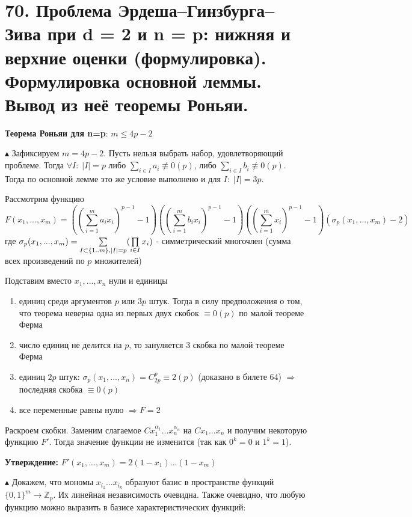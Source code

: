 \section*{70. Проблема Эрдеша–Гинзбурга–Зива при d = 2 и n = p: нижняя и верхние оценки (формулировка). Формулировка основной леммы. Вывод из неё теоремы Роньяи.}
\par \textbf{Теорема Роньяи для n=p}: $m \leq 4p-2$
\par $\blacktriangle$ Зафиксируем $m=4p-2$. Пусть нельзя выбрать набор, удовлетворяющий проблеме. Тогда $\forall I: \; |I|=p$ либо $\sum\limits_{i \in I}a_i \not\equiv 0(p)$, либо $\sum\limits_{i \in I}b_i \not\equiv 0(p)$. Тогда по основной лемме это же условие выполнено и для $I: \; |I|=3p$.
\par Рассмотрим функцию
$$F(x_1, ..., x_m)=\left(\left(\sum_{i = 1}^m a_i x_i\right)^{p-1}-1\right)\left(\left(\sum_{i = 1}^m b_i x_i\right)^{p-1}-1\right)\left(\left(\sum_{i = 1}^m  x_i\right)^{p-1}-1\right)\left(\sigma_p(x_1, ..., x_m)-2\right)$$
где $\sigma_p(x_1, ..., x_m) = \sum\limits_{I \subset \{1..m\},\\ |I|=p}(\prod\limits_{i \in I} x_i)$ - симметрический многочлен (сумма всех произведений по $p$ множителей)
\par Подставим вместо $x_1, ..., x_n$ нули и единицы
\begin{enumerate}
    \item единиц среди аргументов $p$ или $3p$ штук. Тогда в силу предположения о том, что теорема неверна одна из первых двух скобок $\equiv 0(p)$ по малой теореме Ферма
    \item число единиц не делится на $p$, то зануляется 3 скобка по малой теореме Ферма
    \item единиц $2p$ штук: $\sigma_p(x_1, ..., x_n) = C_{2p}^p \equiv 2 (p)$ (доказано в билете 64) $\Rightarrow$ последняя скобка $\equiv 0(p)$
    \item все переменные равны нулю $\Rightarrow F=2$ 
\end{enumerate}
\par Раскроем скобки. Заменим слагаемое $C x_1^{\alpha_1}...x_n^{\alpha_n}$ на $C x_1...x_n$ и получим некоторую функцию $F'$. Тогда значение функции не изменится (так как $0^k=0$ и $1^k=1$). 
\par \textbf{Утверждение: } $F'(x_1, ..., x_m)=2(1-x_1)...(1-x_m)$
\par $\blacktriangle$ Докажем, что мономы $x_{i_1}...x_{i_k}$ образуют базис в пространстве функций $\{0, 1\}^m \rightarrow \mathbb{Z}_p$. Их линейная независимость очевидна. Также очевидно, что любую функцию можно выразить в базисе характеристических функций:
